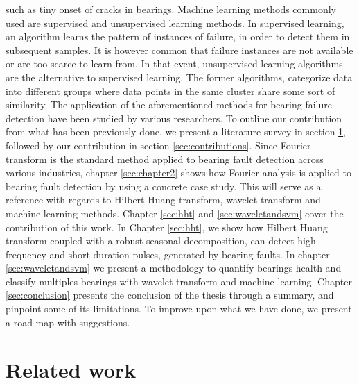 \documentclass[../Main/thesis.tex]{subfiles}
\begin{document}
such as tiny onset of cracks in bearings.
\justify
Machine learning methods commonly used are supervised and unsupervised learning methods. In supervised learning, an algorithm learns the pattern of instances of failure, in order to detect them in subsequent samples. It is however common that failure instances are not available or are too scarce to learn from. In that event, unsupervised learning algorithms are the alternative to supervised learning. The former algorithms, categorize data into different groups where data points in the same cluster share some sort of similarity.
\justify
 The application of the aforementioned methods for bearing failure detection have been studied by various researchers. 
To outline our contribution from what has been previously done, we present a literature survey in section \ref{sec:relatedwork}, followed by our contribution in section \ref{sec:contributions}. Since Fourier transform is the standard method applied to bearing fault detection across various industries, chapter \ref{sec:chapter2} shows how Fourier analysis is applied to bearing fault detection by using a concrete case study. This will serve as a reference with regards to Hilbert Huang transform, wavelet transform and machine learning methods.
\justify
Chapter \ref{sec:hht} and \ref{sec:waveletandsvm} cover the contribution of this work. In Chapter \ref{sec:hht}, we show how Hilbert Huang transform coupled with a robust seasonal decomposition, can detect high frequency and short duration pulses, generated by bearing faults. In chapter \ref{sec:waveletandsvm} we present a methodology to quantify bearings health and classify multiples bearings with wavelet transform and machine learning. Chapter \ref{sec:conclusion} presents the conclusion of the thesis through a summary, and pinpoint some of its limitations. To improve upon what we have done, we present a road map with suggestions.

\section{Related work}
\label{sec:relatedwork}



\end{document}
